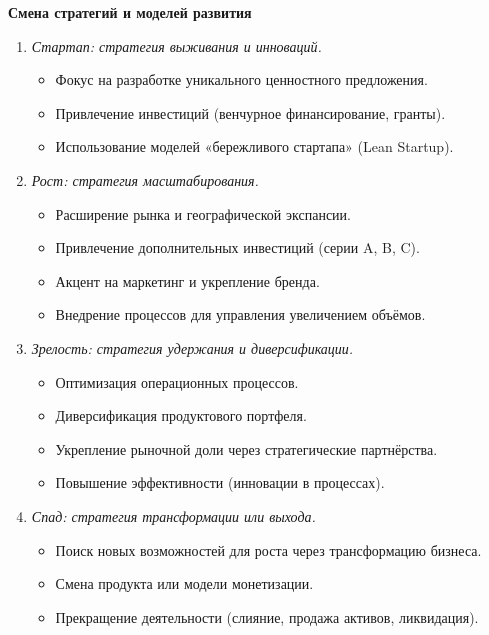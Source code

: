 \textbf{Смена стратегий и моделей развития}
\begin{enumerate}
    \item \textit{Стартап: стратегия выживания и инноваций.}
    \begin{itemize}
        \item Фокус на разработке уникального ценностного предложения.
        \item Привлечение инвестиций (венчурное финансирование, гранты).
        \item Использование моделей «бережливого стартапа» (Lean Startup).
    \end{itemize}
    
    \item \textit{Рост: стратегия масштабирования.}
    \begin{itemize}
        \item Расширение рынка и географической экспансии.
        \item Привлечение дополнительных инвестиций (серии A, B, C).
        \item Акцент на маркетинг и укрепление бренда.
        \item Внедрение процессов для управления увеличением объёмов.
    \end{itemize}
    
    \item \textit{Зрелость: стратегия удержания и диверсификации.}
    \begin{itemize}
        \item Оптимизация операционных процессов.
        \item Диверсификация продуктового портфеля.
        \item Укрепление рыночной доли через стратегические партнёрства.
        \item Повышение эффективности (инновации в процессах).
    \end{itemize}
    
    \item \textit{Спад: стратегия трансформации или выхода.}
    \begin{itemize}
        \item Поиск новых возможностей для роста через трансформацию бизнеса.
        \item Смена продукта или модели монетизации.
        \item Прекращение деятельности (слияние, продажа активов, ликвидация).
    \end{itemize}
\end{enumerate}

